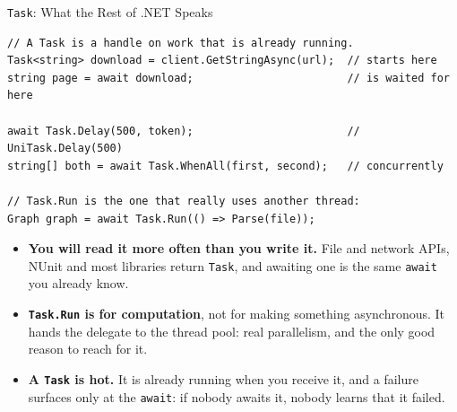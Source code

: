 \begin{frame}[fragile]{\texttt{Task}: What the Rest of .NET Speaks}
  \begin{lstlisting}[basicstyle=\scriptsize\ttfamily]
// A Task is a handle on work that is already running.
Task<string> download = client.GetStringAsync(url);  // starts here
string page = await download;                        // is waited for here

await Task.Delay(500, token);                        // UniTask.Delay(500)
string[] both = await Task.WhenAll(first, second);   // concurrently

// Task.Run is the one that really uses another thread:
Graph graph = await Task.Run(() => Parse(file));
  \end{lstlisting}
  \vspace{0.5ex}

  \begin{itemize}
    \item \textbf{You will read it more often than you write it.} File and
      network APIs, NUnit and most libraries return \texttt{Task}, and awaiting
      one is the same \texttt{await} you already know.
    \item \textbf{\texttt{Task.Run} is for computation}, not for making
      something asynchronous. It hands the delegate to the thread pool: real
      parallelism, and the only good reason to reach for it.
    \item \textbf{A \texttt{Task} is hot.} It is already running when you
      receive it, and a failure surfaces only at the \texttt{await}: if nobody
      awaits it, nobody learns that it failed.
  \end{itemize}
\end{frame}

